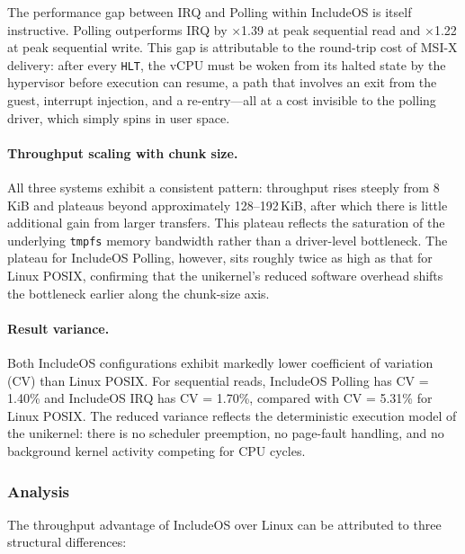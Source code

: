 The performance gap between IRQ and Polling within IncludeOS is itself
instructive.  Polling outperforms IRQ by $\times$1.39 at peak sequential
read and $\times$1.22 at peak sequential write.  This gap is attributable
to the round-trip cost of MSI-X delivery: after every \texttt{HLT}, the
vCPU must be woken from its halted state by the hypervisor before
execution can resume, a path that involves an exit from the guest,
interrupt injection, and a re-entry—all at a cost invisible to the
polling driver, which simply spins in user space.

\paragraph{Throughput scaling with chunk size.}
All three systems exhibit a consistent pattern: throughput rises steeply
from 8\,KiB and plateaus beyond approximately 128--192\,KiB, after which
there is little additional gain from larger transfers.  This plateau
reflects the saturation of the underlying \texttt{tmpfs} memory bandwidth
rather than a driver-level bottleneck.  The plateau for IncludeOS
Polling, however, sits roughly twice as high as that for Linux POSIX,
confirming that the unikernel's reduced software overhead shifts the
bottleneck earlier along the chunk-size axis.

\paragraph{Result variance.}
Both IncludeOS configurations exhibit markedly lower coefficient of
variation (CV) than Linux POSIX.  For sequential reads, IncludeOS
Polling has CV = 1.40\% and IncludeOS IRQ has CV = 1.70\%, compared with
CV = 5.31\% for Linux POSIX.  The reduced variance reflects the
deterministic execution model of the unikernel: there is no scheduler
preemption, no page-fault handling, and no background kernel activity
competing for CPU cycles.

\subsubsection{Analysis}

The throughput advantage of IncludeOS over Linux can be attributed to
three structural differences:

